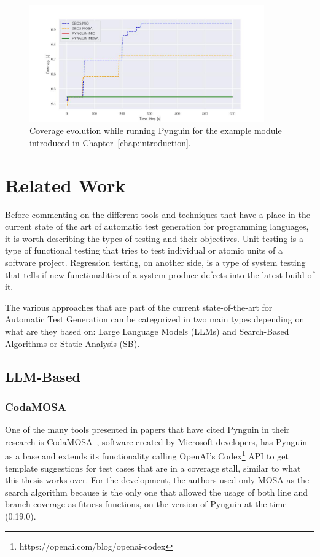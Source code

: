 \documentclass[%
  chapterprefix=false,%
  open=right,%
  twoside=true,%
  paper=a4,%
  logofile={Figures/logo.png},%
  thesistype=master,%
  UKenglish,%
]{se2thesis}
\begin{document}
\begin{figure}[htb]
  \centering
  \includegraphics[width=0.9\textwidth]{Figures/Results/exampleCov.jpg}
  \caption{Coverage evolution while running Pynguin for the example module introduced in Chapter~\ref{chap:introduction}.}\label{fig:example_cov}
\end{figure}

\chapter{Related Work}\label{chap:related_work}

Before commenting on the different tools and techniques that have a place in the current state of the art of automatic test generation for programming languages, it is worth describing the types of testing and their objectives. Unit testing is a type of functional testing that tries to test individual or atomic units of a software project.
Regression testing, on another side, is a type of system testing that tells if new functionalities of a system produce defects into the latest build of it.

The various approaches that are part of the current state-of-the-art for Automatic Test Generation can be categorized in two main types depending on what are they based on: Large Language Models (LLMs) and Search-Based Algorithms or Static Analysis (SB).

\section{LLM-Based}

\subsection*{CodaMOSA}

One of the many tools presented in papers that have cited Pynguin in their research is CodaMOSA~\cite{DBLP:conf/icse/LemieuxILS23}, software created by Microsoft developers, has Pynguin as a base and extends its functionality calling OpenAI's Codex\footnote{https://openai.com/blog/openai-codex} API to get template suggestions for test cases that are in a coverage stall, similar to what this thesis works over.
For the development, the authors used only MOSA as the search algorithm because is the only one that allowed the usage of both line and branch coverage as fitness functions, on the version of Pynguin at the time (0.19.0).
\end{document}
